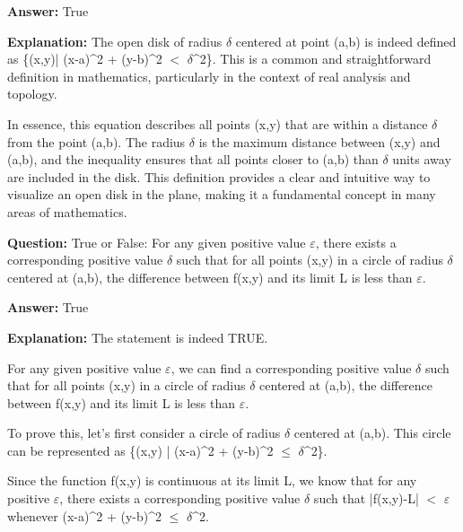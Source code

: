 \documentclass{article}
\begin{document}
                \textbf{Answer:} True

                \textbf{Explanation:} The open disk of radius \ensuremath{\delta} centered at point (a,b) is indeed defined as \{(x,y)| (x-a){\textasciicircum}2 + (y-b){\textasciicircum}2 \ensuremath{<} \ensuremath{\delta}{\textasciicircum}2\}. This is a common and straightforward definition in mathematics, particularly in the context of real analysis and topology. 

In essence, this equation describes all points (x,y) that are within a distance \ensuremath{\delta} from the point (a,b). The radius \ensuremath{\delta} is the maximum distance between (x,y) and (a,b), and the inequality ensures that all points closer to (a,b) than \ensuremath{\delta} units away are included in the disk. This definition provides a clear and intuitive way to visualize an open disk in the plane, making it a fundamental concept in many areas of mathematics.
                
                \vspace{0.5cm} 
        
            
                \textbf {Question:} True or False: For any given positive value \ensuremath{\varepsilon}, there exists a corresponding positive value \ensuremath{\delta} such that for all points (x,y) in a circle of radius \ensuremath{\delta} centered at (a,b), the difference between f(x,y) and its limit L is less than \ensuremath{\varepsilon}.
                
                \textbf{Answer:} True

                \textbf{Explanation:} The statement is indeed TRUE.

For any given positive value \ensuremath{\varepsilon}, we can find a corresponding positive value \ensuremath{\delta} such that for all points (x,y) in a circle of radius \ensuremath{\delta} centered at (a,b), the difference between f(x,y) and its limit L is less than \ensuremath{\varepsilon}.

To prove this, let's first consider a circle of radius \ensuremath{\delta} centered at (a,b). This circle can be represented as \{(x,y) | (x-a){\textasciicircum}2 + (y-b){\textasciicircum}2 \ensuremath{\leq} \ensuremath{\delta}{\textasciicircum}2\}.

Since the function f(x,y) is continuous at its limit L, we know that for any positive \ensuremath{\varepsilon}, there exists a corresponding positive value \ensuremath{\delta} such that |f(x,y)-L| \ensuremath{<} \ensuremath{\varepsilon} whenever (x-a){\textasciicircum}2 + (y-b){\textasciicircum}2 \ensuremath{\leq} \ensuremath{\delta}{\textasciicircum}2.
\end{document}
